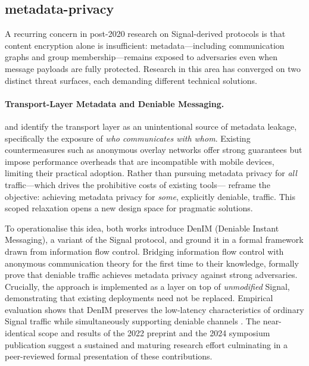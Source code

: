 \subsection{metadata-privacy}

A recurring concern in post-2020 research on Signal-derived protocols is that content encryption alone is insufficient: metadata—including communication graphs and group membership—remains exposed to adversaries even when message payloads are fully protected. Research in this area has converged on two distinct threat surfaces, each demanding different technical solutions.

\paragraph{Transport-Layer Metadata and Deniable Messaging.}
\textcite{nelson2022} and \textcite{nelson2024} identify the transport layer as an unintentional source of metadata leakage, specifically the exposure of \emph{who communicates with whom}. Existing countermeasures such as anonymous overlay networks offer strong guarantees but impose performance overheads that are incompatible with mobile devices, limiting their practical adoption. Rather than pursuing metadata privacy for \emph{all} traffic—which drives the prohibitive costs of existing tools—\textcite{nelson2022,nelson2024} reframe the objective: achieving metadata privacy for \emph{some}, explicitly deniable, traffic. This scoped relaxation opens a new design space for pragmatic solutions.

To operationalise this idea, both works introduce DenIM (Deniable Instant Messaging), a variant of the Signal protocol, and ground it in a formal framework drawn from information flow control. Bridging information flow control with anonymous communication theory for the first time to their knowledge, \textcite{nelson2022,nelson2024} formally prove that deniable traffic achieves metadata privacy against strong adversaries. Crucially, the approach is implemented as a layer on top of \emph{unmodified} Signal, demonstrating that existing deployments need not be replaced. Empirical evaluation shows that DenIM preserves the low-latency characteristics of ordinary Signal traffic while simultaneously supporting deniable channels \parencite{nelson2022,nelson2024}. The near-identical scope and results of the 2022 preprint \parencite{nelson2022} and the 2024 symposium publication \parencite{nelson2024} suggest a sustained and maturing research effort culminating in a peer-reviewed formal presentation of these contributions.

